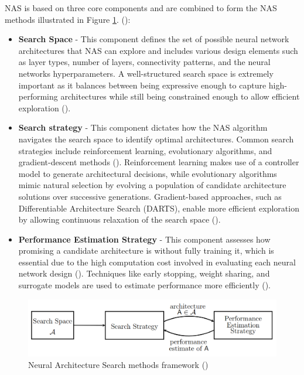 \noindent NAS is based on three core components and are combined to form the NAS methods illustrated in Figure \ref{fig:ne_nas}. (\cite{elsken2019neural}):

\begin{itemize}
    \item \textbf{Search Space} - This component defines the set of possible neural network architectures that NAS can explore and includes various design elements such as layer types, number of layers, connectivity patterns, and the neural networks hyperparameters. A well-structured search space is extremely important as it balances between being expressive enough to capture high-performing architectures while still being constrained enough to allow efficient exploration (\cite{elsken2019neural}).
    \item \textbf{Search strategy} - This component dictates how the NAS algorithm navigates the search space to identify optimal architectures. Common search strategies include reinforcement learning, evolutionary algorithms, and gradient-descent methods (\cite{liu2021survey}). Reinforcement learning makes use of a controller model to generate architectural decisions, while evolutionary algorithms mimic natural selection by evolving a population of candidate architecture solutions over successive generations. Gradient-based approaches, such as Differentiable Architecture Search (DARTS), enable more efficient exploration by allowing continuous relaxation of the search space (\cite{liu2021survey}).
    \item \textbf{Performance Estimation Strategy} - This component assesses how promising a candidate architecture is without fully training it, which is essential due to the high computation cost involved in evaluating each neural network design (\cite{elsken2019neural}). Techniques like early stopping, weight sharing, and surrogate models are used to estimate performance more efficiently (\cite{elsken2019neural}).
\end{itemize}

\begin{figure}[H] %
	\centering %
	\includegraphics[width=\textwidth]{Figures/chapter_ne/ne_nas.png} %
	\caption{Neural Architecture Search methods framework (\cite{elsken2019neural})}
	\label{fig:ne_nas} %
\end{figure}

